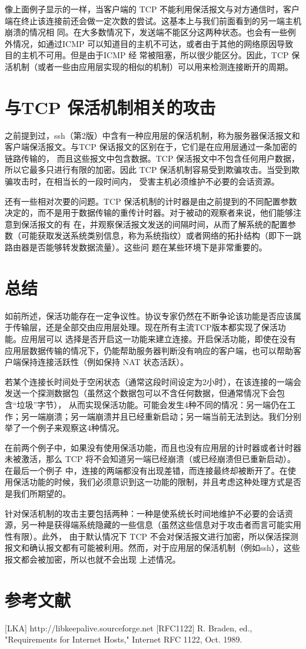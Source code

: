像上面例子显示的一样，当客户端的 TCP 不能利用保活报文与对方通信时，客户端在终止该连接前还会做一定次数的尝试。这基本上与我们前面看到的另一端主机崩溃的情况相
同。在大多数情况下，发送端不能区分这两种状态。也会有一些例外情况，如通过ICMP 可以知道目的主机不可达，或者由于其他的网络原因导致目的主机不可用。但是由于ICMP 经
常被阻塞，所以很少能区分。因此，TCP 保活机制（或者一些由应用层实现的相似的机制）可以用来检测连接断开的周期。

\section{与TCP 保活机制相关的攻击}
之前提到过，ssh（第2版）中含有一种应用层的保活机制，称为服务器保活报文和客户端保活报文。与TCP 保话报文的区别在于，它们是在应用层通过一条加密的链路传输的，
而且这些报文中包含数据。TCP 保活报文中不包含任何用户数据，所以它最多只进行有限的加密。因此 TCP 保活机制容易受到欺骗攻击。当受到欺骗攻击时，在相当长的一段时间内，
受害主机必须维护不必要的会话资源。

还有一些相对次要的问题。TCP 保活机制的计时器是由之前提到的不同配置参数决定的，而不是用于数据传输的重传计时器。对于被动的观察者来说，他们能够注意到保活报文的有
在，并观察保活报文发送的间隔时间，从而了解系统的配置参数（可能获取发送系统类别信息，称为系统指纹）或者网络的拓扑结构（即下一跳路由器是否能够转发数据流量）。这些问
题在某些环境下是非常重要的。

\section{总结}
如前所述，保活功能存在一定争议性。协议专家仍然在不断争论该功能是否应该属于传输层，还是全部交由应用层处理。现在所有主流TCP版本都实现了保活功能。应用层可以
选择是否开启这一功能来建立连接。开启保活功能，即使在没有应用层数据传输的情况下，仍能帮助服务器判断没有响应的客户端，也可以帮助客户端保持连接活跃性（例如保持 NAT
状态活跃）。

若某个连接长时间处于空闲状态（通常这段时间设定为2小时），在该连接的一端会发送一个探测数据包（虽然这个数据包可以不含任何数据，但通常情况下会包含“垃圾”字节），
从而实现保活功能。可能会发生4种不同的情况：另一端仍在工作；另一端崩溃；另一端崩溃并且已经重新启动；另一端当前无法到达。我们分别举了一个例子来观察这4种情况。

在前两个例子中，如果没有使用保活功能，而且也没有应用层的计时器或者计时器未被激活，那么 TCP 将不会知道另一端已经崩溃（或已经崩溃但已重新启动）。在最后一个例子
中，连接的两端都没有出现差错，而连接最终却被断开了。在使用保活功能的时候，我们必须意识到这一功能的限制，并且考虑这种处理方式是否是我们所期望的。

针对保活机制的攻击主要包括两种：一种是使系统长时间地维护不必要的会话资源，另一种是获得端系统隐藏的一些信息（虽然这些信息对于攻击者而言可能实用性有限）。此外，
由于默认情况下 TCP 不会对保活报文进行加密，所以保活探测报文和确认报文都有可能被利用。然而，对于应用层的保活机制（例如ssh），这些报文都会被加密，所以也就不会出现
上述情况。

\section{参考文献}
[LKA] http://libkeepalive.sourceforge.net
[RFC1122] R. Braden, ed., "Requirements for Internet Hosts," Internet RFC 1122, Oct. 1989.